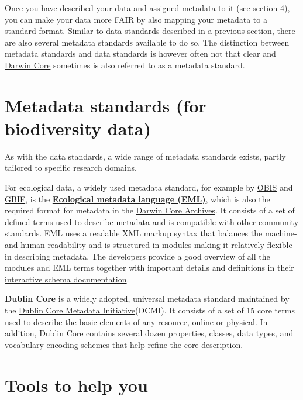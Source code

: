 \documentclass[
]{book}
\begin{document}
Once you have described your data and assigned \protect\hyperlink{metadata}{metadata} to it (see \protect\hyperlink{describe-data}{section 4}), you can make your data more FAIR by also mapping your metadata to a standard format. Similar to data standards described in a previous section, there are also several metadata standards available to do so. The distinction between metadata standards and data standards is however often not that clear and \protect\hyperlink{DwC}{Darwin Core} sometimes is also referred to as a metadata standard.

\hypertarget{metadata-standards-for-biodiversity-data}{%
\section{Metadata standards (for biodiversity data)}\label{metadata-standards-for-biodiversity-data}}

As with the data standards, a wide range of metadata standards exists, partly tailored to specific research domains.

For ecological data, a widely used metadata standard, for example by \protect\hyperlink{OBIS}{OBIS} and \protect\hyperlink{GBIF}{GBIF}, is the \protect\hyperlink{eml}{\textbf{Ecological metadata language (EML)}}, which is also the required format for metadata in the \protect\hyperlink{DwC-A}{Darwin Core Archives}. It consists of a set of defined terms used to describe metadata and is compatible with other community standards. EML uses a readable \protect\hyperlink{XML}{XML} markup syntax that balances the machine- and human-readability and is structured in modules making it relatively flexible in describing metadata. The developers provide a good overview of all the modules and EML terms together with important details and definitions in their \href{https://eml.ecoinformatics.org/schema/}{interactive schema documentation}.

\textbf{Dublin Core} is a widely adopted, universal metadata standard maintained by the \href{https://dublincore.org/}{Dublin Core Metadata Initiative}(DCMI). It consists of a set of 15 core terms used to describe the basic elements of any resource, online or physical. In addition, Dublin Core contains several dozen properties, classes, data types, and vocabulary encoding schemes that help refine the core description.

\hypertarget{tools-to-help-you-4}{%
\section{Tools to help you}\label{tools-to-help-you-4}}
\end{document}
